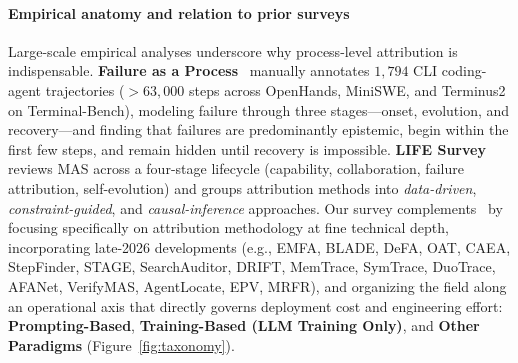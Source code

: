 \paragraph{Empirical anatomy and relation to prior surveys}
Large-scale empirical analyses underscore why process-level attribution is indispensable. \textbf{Failure as a Process}~\citep{zhao2026failureprocess} manually annotates $1{,}794$ CLI coding-agent trajectories ($>63{,}000$ steps across OpenHands, MiniSWE, and Terminus2 on Terminal-Bench), modeling failure through three stages---onset, evolution, and recovery---and finding that failures are predominantly epistemic, begin within the first few steps, and remain hidden until recovery is impossible. \textbf{LIFE Survey}~\citep{qi2026life} reviews MAS across a four-stage lifecycle (capability, collaboration, failure attribution, self-evolution) and groups attribution methods into \emph{data-driven}, \emph{constraint-guided}, and \emph{causal-inference} approaches.
Our survey complements~\citep{qi2026life} by focusing specifically on attribution methodology at fine technical depth, incorporating late-2026 developments (e.g., EMFA, BLADE, DeFA, OAT, CAEA, StepFinder, STAGE, SearchAuditor, DRIFT, MemTrace, SymTrace, DuoTrace, AFANet, VerifyMAS, AgentLocate, EPV, MRFR), and organizing the field along an operational axis that directly governs deployment cost and engineering effort: \textbf{Prompting-Based}, \textbf{Training-Based (LLM Training Only)}, and \textbf{Other Paradigms} (Figure~\ref{fig:taxonomy}).

